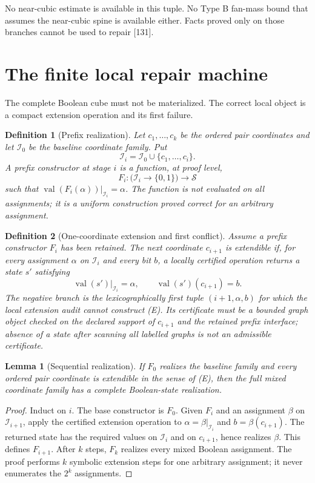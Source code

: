 \documentclass[11pt]{article}
\newtheorem{lemma}{Lemma}
\newtheorem{definition}{Definition}
\newcommand{\States}{\mathcal S}
\newcommand{\Coords}{\mathcal I}
\begin{document}
No near-cubic estimate is available in this tuple.  No Type B fan-mass bound
that assumes the near-cubic spine is available either.  Facts proved only on
those branches cannot be used to repair [131].

\section{The finite local repair machine}

The complete Boolean cube must not be materialized.  The correct local object
is a compact extension operation and its first failure.

\begin{definition}[Prefix realization]
Let $c_1,\ldots,c_k$ be the ordered pair coordinates and let $\Coords_0$ be
the baseline coordinate family.  Put
\[
\Coords_i=\Coords_0\cup\{c_1,\ldots,c_i\}.
\]
A prefix constructor at stage $i$ is a function, at proof level,
\[
F_i:\bigl(\Coords_i\to\{0,1\}\bigr)\longrightarrow\States
\]
such that $\operatorname{val}(F_i(\alpha))|_{\Coords_i}=\alpha$.  The function
is not evaluated on all assignments; it is a uniform construction proved
correct for an arbitrary assignment.
\end{definition}

\begin{definition}[One-coordinate extension and first conflict]
Assume a prefix constructor $F_i$ has been retained.  The next coordinate
$c_{i+1}$ is \emph{extendible} if, for every assignment $\alpha$ on
$\Coords_i$ and every bit $b$, a locally certified operation returns a state
$s'$ satisfying
\[
\operatorname{val}(s')|_{\Coords_i}=\alpha,
\qquad
\operatorname{val}(s')(c_{i+1})=b. \tag{E}
\]
The negative branch is the lexicographically first tuple $(i+1,\alpha,b)$
for which the local extension audit cannot construct (E).  Its certificate
must be a bounded graph object checked on the declared support of
$c_{i+1}$ and the retained prefix interface; absence of a state after scanning
all labelled graphs is not an admissible certificate.
\end{definition}

\begin{lemma}[Sequential realization]
If $F_0$ realizes the baseline family and every ordered pair coordinate is
extendible in the sense of (E), then the full mixed coordinate family has a
complete Boolean-state realization.
\end{lemma}

\begin{proof}
Induct on $i$.  The base constructor is $F_0$.  Given $F_i$ and an assignment
$\beta$ on $\Coords_{i+1}$, apply the certified extension operation to
$\alpha=\beta|_{\Coords_i}$ and $b=\beta(c_{i+1})$.  The returned state has
the required values on $\Coords_i$ and on $c_{i+1}$, hence realizes $\beta$.
This defines $F_{i+1}$.  After $k$ steps, $F_k$ realizes every mixed Boolean
assignment.  The proof performs $k$ symbolic extension steps for one arbitrary
assignment; it never enumerates the $2^k$ assignments.
\end{proof}
\end{document}

